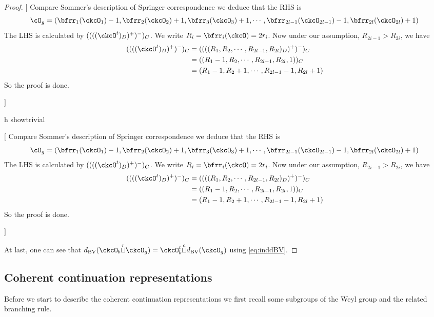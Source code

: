 \documentclass[12pt,a4paper]{amsart}
\newcommand{\trivial}[2][]{\if\relax\detokenize{#1}\relax
  {%
      \color{orange} \vspace{0em} $[$  #2 $]$
      \color{black}
  }
  \else
\ifx#1h
\ifcsname showtrivial\endcsname
{%
    \color{orange} \vspace{0em}  $[$ #2 $]$
    \color{black}
}
\fi
\else {\red Wrong argument!} \fi
\fi
}
\numberwithin{equation}{section}
\theoremstyle{remark}
\newtheorem*{remark}{Remark}
\def\dBV{d_{\mathrm{BV}}}
\def\cuprow{{\stackrel{r}{\sqcup}}}
\def\cupcol{{\stackrel{c}{\sqcup}}}
\begin{document}
\begin{proof}
\trivial[]{
  Compare Sommer's description of Springer correspondence
  we deduce that the RHS is
  \[
    \cO_{g} = (\bfrr_{1}(\ckcO_{1})-1,\bfrr_{2}(\ckcO_{2})+1,\bfrr_{3}(\ckcO_{3})+1,
    \cdots, \bfrr_{2l-1}(\ckcO_{2l-1})-1,\bfrr_{2l}(\ckcO_{2l})+1)
  \]
  The LHS is calculated by
  $((((\ckcO^{t})_{D})^{+})^{-})_{C}$.
  We write $R_{i}=\bfrr_{i}(\ckcO)=2r_{i}$.
  Now under our assumption, $R_{2i-1}>R_{2i}$, we have
  \[
    \begin{split}
      ((((\ckcO^{t})_{D})^{+})^{-})_{C} &=
      ((((R_{1},R_{2}, \cdots, R_{2l-1},R_{2l})_{D})^{+})^{-})_{C}\\
      &=((R_{1}-1,R_{2}, \cdots, R_{2l-1},R_{2l},1))_{C}\\
      &=(R_{1}-1,R_{2}+1, \cdots, R_{2l-1}-1,R_{2l}+1)\\
    \end{split}
  \]
  So the proof is done.

}

At last, one can see that
$\dBV(\ckcO_{b}\cuprow \ckcO_{g})
= \ckcO_{b}^{t} \cupcol \dBV(\ckcO_{g})$ using
\eqref{eq:inddBV}.
  \end{proof}


\subsection{Coherent continuation representations}


Before we start to describe the coherent continuation representations
we first recall some subgroups of the Weyl group and the related branching rule.
\end{document}

